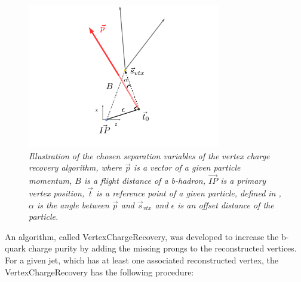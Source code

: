 \begin{figure}
{\centering
    \includegraphics[width=0.75\textwidth]{ILD/plots/recovery-graph.pdf}
    \caption{\sl Illustration of the chosen separation variables of the vertex charge recovery algorithm, where $\vec{p}$ is a vector of a given particle momentum, $B$ is a flight distance of a b-hadron, $\vec{IP}$ is a primary vertex position, $\vec{t}$ is a reference point of a given particle, defined in \cite{bib:LCIOtrack}, $\alpha$ is the angle between $\vec{p}$ and $\vec{s}_{vtx}$ and $\epsilon$ is an offset distance of the particle. %
    }
    \label{fig:VtxRecovery_3}
  }
\end{figure}

An algorithm, called VertexChargeRecovery, was developed to increase the b-quark charge purity by adding the missing prongs to the reconstructed vertices.  For a given jet, which has at least one associated reconstructed vertex, the VertexChargeRecovery has the following procedure:

